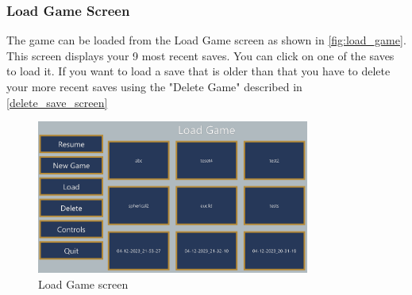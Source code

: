 \subsubsection{Load Game Screen}
The game can be loaded from the Load Game screen as shown in \autoref{fig:load_game}.
This screen displays your 9 most recent saves.
You can click on one of the saves to load it.
If you want to load a save that is older than that you have to delete your more recent saves using the "Delete Game" described in \autoref{delete_save_screen}

\begin{figure}[H]
    \centering
    \includegraphics[width=0.8\textwidth]{chapters/user_manual/resources/load-game.png}
    \caption{Load Game screen}
    \label{fig:load_game}
\end{figure}